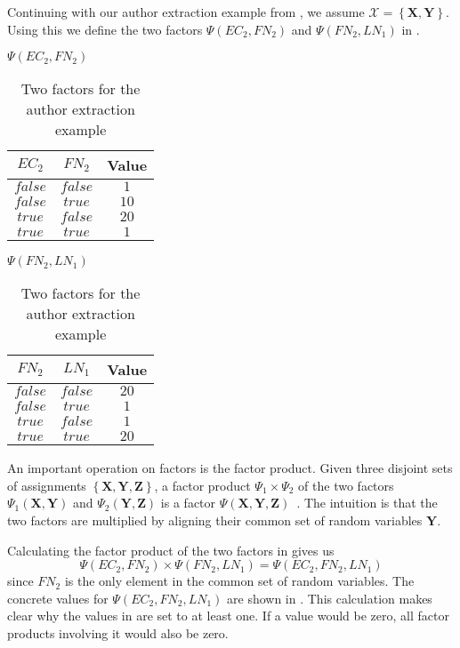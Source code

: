 Continuing with our author extraction example from , we assume $\mathcal{X}=\left\{\mathbf{X},\mathbf{Y}\right\}$.
Using this we define the two factors $\Psi(EC_2,FN_2)$ and $\Psi(FN_2,LN_1)$ in .
\begin{table}[t]
\begin{minipage}{0.5\linewidth}
\centering
$\Psi(EC_2,FN_2)$\par
\smallskip
\begin{tabular}{c c c}
 \toprule
 $EC_2$ & $FN_2$ & Value \\
 \midrule
 $false$ & $false$ & $1$ \\
 $false$ & $true$ & $10$ \\
 $true$ & $false$ & $20$ \\
 $true$ & $true$ & $1$ \\
 \bottomrule
\end{tabular}
\end{minipage}
\hfill
\begin{minipage}{0.5\linewidth}
\centering
$\Psi(FN_2,LN_1)$\par
\smallskip
\begin{tabular}{c c c}
 \toprule
 $FN_2$ & $LN_1$ & Value \\
 \midrule
 $false$ & $false$ & $20$ \\
 $false$ & $true$ & $1$ \\
 $true$ & $false$ & $1$ \\
 $true$ & $true$ & $20$ \\
 \bottomrule
\end{tabular}
\end{minipage}
\caption{Two factors for the author extraction example}
\label{tab:example-factors}
\end{table}

\bigskip

An important operation on factors is the \gls{factor product}.
Given three disjoint sets of assignments $\left\{\mathbf{X}, \mathbf{Y}, \mathbf{Z}\right\}$, a \gls{factor product} $\Psi_1\times\Psi_2$ of the two factors $\Psi_1(\mathbf{X},\mathbf{Y})$ and $\Psi_2(\mathbf{Y},\mathbf{Z})$ is a factor $\Psi(\mathbf{X},\mathbf{Y},\mathbf{Z})$~\citep{koller2009probabilistic}.
The intuition is that the two factors are multiplied by aligning their common set of \glspl{random variable} $\mathbf{Y}$.

Calculating the \gls{factor product} of the two \glspl{factor} in  gives us
\begin{equation*}
  \Psi(EC_2,FN_2)\times\Psi(FN_2,LN_1)=\Psi(EC_2,FN_2,LN_1)
\end{equation*}
since $FN_2$ is the only element in the common set of \glspl{random variable}.
The concrete values for $\Psi(EC_2,FN_2,LN_1)$ are shown in .
This calculation makes clear why the values in  are set to at least one.
If a value would be zero, all factor products involving it would also be zero.

